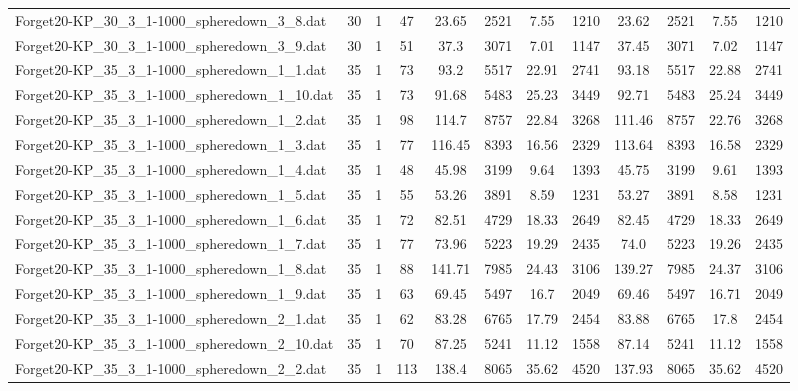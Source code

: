 \begin{sidewaystable}[!ht]
{\begin{tabular}{lccccccccccc}
Forget20-KP\_30\_3\_1-1000\_spheredown\_3\_8.dat & 30 & 1 & 47 & 23.65 & 2521 & 7.55 & 1210 & 23.62 & 2521 & 7.55 & 1210 \\
Forget20-KP\_30\_3\_1-1000\_spheredown\_3\_9.dat & 30 & 1 & 51 & 37.3 & 3071 &  \textcolor{blue2}{7.01} & 1147 & 37.45 & 3071 & 7.02 & 1147 \\
Forget20-KP\_35\_3\_1-1000\_spheredown\_1\_1.dat & 35 & 1 & 73 & 93.2 & 5517 & 22.91 & 2741 & 93.18 & 5517 &  \textcolor{blue2}{22.88} & 2741 \\
Forget20-KP\_35\_3\_1-1000\_spheredown\_1\_10.dat & 35 & 1 & 73 & 91.68 & 5483 & 25.23 & 3449 & 92.71 & 5483 & 25.24 & 3449 \\
Forget20-KP\_35\_3\_1-1000\_spheredown\_1\_2.dat & 35 & 1 & 98 & 114.7 & 8757 & 22.84 & 3268 & 111.46 & 8757 &  \textcolor{blue2}{22.76} & 3268 \\
Forget20-KP\_35\_3\_1-1000\_spheredown\_1\_3.dat & 35 & 1 & 77 & 116.45 & 8393 &  \textcolor{blue2}{16.56} & 2329 & 113.64 & 8393 & 16.58 & 2329 \\
Forget20-KP\_35\_3\_1-1000\_spheredown\_1\_4.dat & 35 & 1 & 48 & 45.98 & 3199 & 9.64 & 1393 & 45.75 & 3199 &  \textcolor{blue2}{9.61} & 1393 \\
Forget20-KP\_35\_3\_1-1000\_spheredown\_1\_5.dat & 35 & 1 & 55 & 53.26 & 3891 & 8.59 & 1231 & 53.27 & 3891 &  \textcolor{blue2}{8.58} & 1231 \\
Forget20-KP\_35\_3\_1-1000\_spheredown\_1\_6.dat & 35 & 1 & 72 & 82.51 & 4729 &  \textcolor{blue2}{18.33} & 2649 & 82.45 & 4729 &  \textcolor{blue2}{18.33} & 2649 \\
Forget20-KP\_35\_3\_1-1000\_spheredown\_1\_7.dat & 35 & 1 & 77 & 73.96 & 5223 & 19.29 & 2435 & 74.0 & 5223 &  \textcolor{blue2}{19.26} & 2435 \\
Forget20-KP\_35\_3\_1-1000\_spheredown\_1\_8.dat & 35 & 1 & 88 & 141.71 & 7985 & 24.43 & 3106 & 139.27 & 7985 &  \textcolor{blue2}{24.37} & 3106 \\
Forget20-KP\_35\_3\_1-1000\_spheredown\_1\_9.dat & 35 & 1 & 63 & 69.45 & 5497 &  \textcolor{blue2}{16.7} & 2049 & 69.46 & 5497 & 16.71 & 2049 \\
Forget20-KP\_35\_3\_1-1000\_spheredown\_2\_1.dat & 35 & 1 & 62 & 83.28 & 6765 &  \textcolor{blue2}{17.79} & 2454 & 83.88 & 6765 & 17.8 & 2454 \\
Forget20-KP\_35\_3\_1-1000\_spheredown\_2\_10.dat & 35 & 1 & 70 & 87.25 & 5241 &  \textcolor{blue2}{11.12} & 1558 & 87.14 & 5241 &  \textcolor{blue2}{11.12} & 1558 \\
Forget20-KP\_35\_3\_1-1000\_spheredown\_2\_2.dat & 35 & 1 & 113 & 138.4 & 8065 &  \textcolor{blue2}{35.62} & 4520 & 137.93 & 8065 &  \textcolor{blue2}{35.62} & 4520 \\

\end{tabular}}
\end{sidewaystable}
